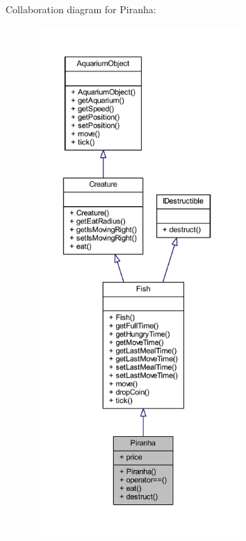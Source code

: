 Collaboration diagram for Piranha\+:
\nopagebreak
\begin{figure}[H]
\begin{center}
\leavevmode
\includegraphics[height=550pt]{class_piranha__coll__graph}
\end{center}
\end{figure}

